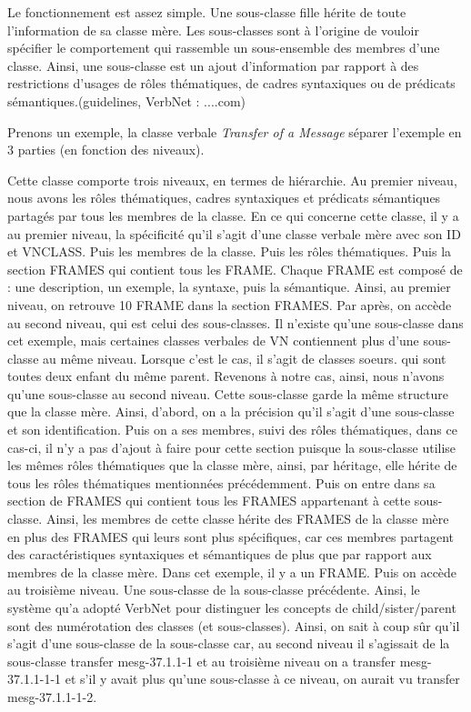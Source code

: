 Le fonctionnement est assez simple. Une sous-classe fille hérite de toute l'information de sa classe mère. Les sous-classes sont à l'origine de vouloir spécifier le comportement qui rassemble un sous-ensemble des membres d'une classe. Ainsi, une sous-classe est un ajout d'information par rapport à des restrictions d'usages de rôles thématiques, de cadres syntaxiques ou de prédicats sémantiques.(guidelines, VerbNet : ....com)

Prenons un exemple, la classe verbale \emph{Transfer of a Message} séparer l'exemple en 3 parties (en fonction des niveaux).

Cette classe comporte trois niveaux, en termes de hiérarchie. Au premier niveau, nous avons les rôles thématiques, cadres syntaxiques et prédicats sémantiques partagés par tous les membres de la classe. En ce qui concerne cette classe, il y a au premier niveau, la spécificité qu'il s'agit d'une classe verbale mère avec son ID et VNCLASS. Puis les membres de la classe. Puis les rôles thématiques. Puis la section FRAMES qui contient tous les FRAME. Chaque FRAME est composé de : une description, un exemple, la syntaxe, puis la sémantique. Ainsi, au premier niveau, on retrouve 10 FRAME dans la section FRAMES. Par après, on accède au second niveau, qui est celui des sous-classes. Il n'existe qu'une sous-classe dans cet exemple, mais certaines classes verbales de VN contiennent plus d'une sous-classe au même niveau. Lorsque c'est le cas, il s'agit de classes soeurs. qui sont toutes deux enfant du même parent. Revenons à notre cas, ainsi, nous n'avons qu'une sous-classe au second niveau. Cette sous-classe garde la même structure que la classe mère. Ainsi, d'abord, on a la précision qu'il s'agit d'une sous-classe et son identification. Puis on a ses membres, suivi des rôles thématiques, dans ce cas-ci, il n'y a pas d'ajout à faire pour cette section puisque la sous-classe utilise les mêmes rôles thématiques que la classe mère, ainsi, par héritage, elle hérite de tous les rôles thématiques mentionnées précédemment. Puis on entre dans sa section de FRAMES qui contient tous les FRAMES appartenant à cette sous-classe. Ainsi, les membres de cette classe hérite des FRAMES de la classe mère en plus des FRAMES qui leurs sont plus spécifiques, car ces membres partagent des caractéristiques syntaxiques et sémantiques de plus que par rapport aux membres de la classe mère. Dans cet exemple, il y a un FRAME. Puis on accède au troisième niveau. Une sous-classe de la sous-classe précédente. Ainsi, le système qu'a adopté VerbNet pour distinguer les concepts de child/sister/parent sont des numérotation des classes (et sous-classes). Ainsi, on sait à coup sûr qu'il s'agit d'une sous-classe de la sous-classe car, au second niveau il s'agissait de la sous-classe transfer mesg-37.1.1-1 et au troisième niveau on a transfer mesg-37.1.1-1-1 et s'il y avait plus qu'une sous-classe à ce niveau, on aurait vu transfer mesg-37.1.1-1-2.

